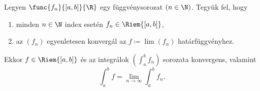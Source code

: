 \documentclass[
]{elteikthesis}[2024/04/26]
\begin{document}
	\begin{theorem}{}{}
		Legyen \( \func{f_n}{[a, b]}{\R} \) egy függvénysorozat \( (n \in \N) \).
		Tegyük fel, hogy
		\begin{enumerate}[label=(\roman*)]
			\item minden \( n \in \N \) index esetén \( f_n \in \Riem{[a, b]} \),
			\item az \( (f_n) \) egyenletesen konvergál az \( f \coloneq \lim(f_n) \) határfüggvényhez.
		\end{enumerate}
		Ekkor \( f \in \Riem{[a, b]} \) és az 
		integrálok \( \left( \int_a^b f_n \right) \) sorozata konvergens, valamint
		\[
			\int_a^b f = \lim_{n \to \infty} \int_a^b f_n.
		\]
	\end{theorem}
\end{document}
